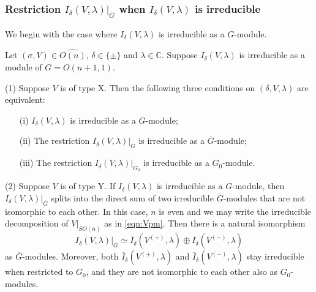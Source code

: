 \subsubsection{Restriction $I_{\delta}(V,\lambda)|_{\overline G}$
 when $I_{\delta}(V,\lambda)$ is irreducible}
We begin with the case
 where $I_{\delta}(V,\lambda)$ is irreducible as a $G$-module.  
\begin{lemma}
\label{lem:170305}
Let $(\sigma,V) \in \widehat{O(n)}$, 
$\delta \in \{\pm \}$
 and $\lambda \in {\mathbb{C}}$.  
Suppose $I_{\delta}(V,\lambda)$ is irreducible 
 as a module of $G=O(n+1,1)$.  
\par\noindent
{\rm{(1)}}\enspace
Suppose $V$ is of type X.  
Then the following three conditions on $(\delta,V,\lambda)$
 are equivalent:
\begin{enumerate}
\item[{\rm{(i)}}]
$I_{\delta}(V,\lambda)$ is irreducible
 as a $G$-module;
\item[{\rm{(ii)}}]
The restriction $I_{\delta}(V,\lambda)|_{\overline G}$ is irreducible
 as a $\overline G$-module;
\item[{\rm{(iii)}}]
The restriction $I_{\delta}(V,\lambda)|_{G_0}$ is irreducible
 as a $G_0$-module.  
\end{enumerate}
{\rm{(2)}}\enspace
Suppose $V$ is of type Y.  
If $I_{\delta}(V,\lambda)$ is irreducible as a $G$-module, 
 then $I_{\delta}(V,\lambda)|_{\overline G}$ splits
 into the direct sum of two irreducible $\overline G$-modules
 that are not isomorphic to each other.  
In this case, 
 $n$ is even
 and we may write the irreducible decomposition
 of $V|_{SO(n)}$
 as in \eqref{eqn:Vpm}.  
Then there is a natural isomorphism 
\[
I_{\delta}(V,\lambda)|_{\overline G}
\simeq
 \overline{I}_{\delta}(V^{(+)},\lambda) \oplus \overline{I}_{\delta}(V^{(-)},\lambda)
\]
 as $\overline G$-modules.  
Moreover,
 both $\overline I_{\delta}(V^{(+)}, \lambda)$
 and $\overline I_{\delta}(V^{(-)}, \lambda)$ stay irreducible
 when restricted to $G_0$, 
 and they are not isomorphic to each other also as $G_0$-modules.  
\end{lemma}

